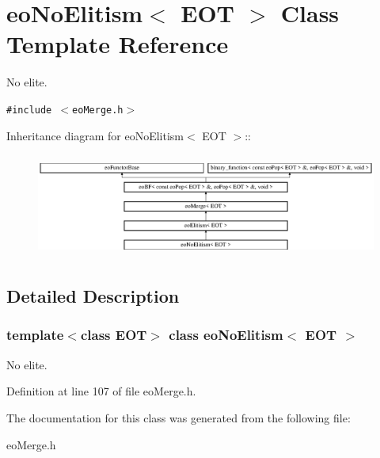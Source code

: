 \section{eo\-No\-Elitism$<$ EOT $>$ Class Template Reference}
\label{classeo_no_elitism}
No elite.  


{\tt \#include $<$eo\-Merge.h$>$}

Inheritance diagram for eo\-No\-Elitism$<$ EOT $>$::\begin{figure}[H]
\begin{center}
\leavevmode
\includegraphics[height=3.4398cm]{classeo_no_elitism}
\end{center}
\end{figure}


\subsection{Detailed Description}
\subsubsection*{template$<$class EOT$>$ class eo\-No\-Elitism$<$ EOT $>$}

No elite. 



Definition at line 107 of file eo\-Merge.h.

The documentation for this class was generated from the following file:\begin{CompactItemize}
\item 
eo\-Merge.h\end{CompactItemize}
